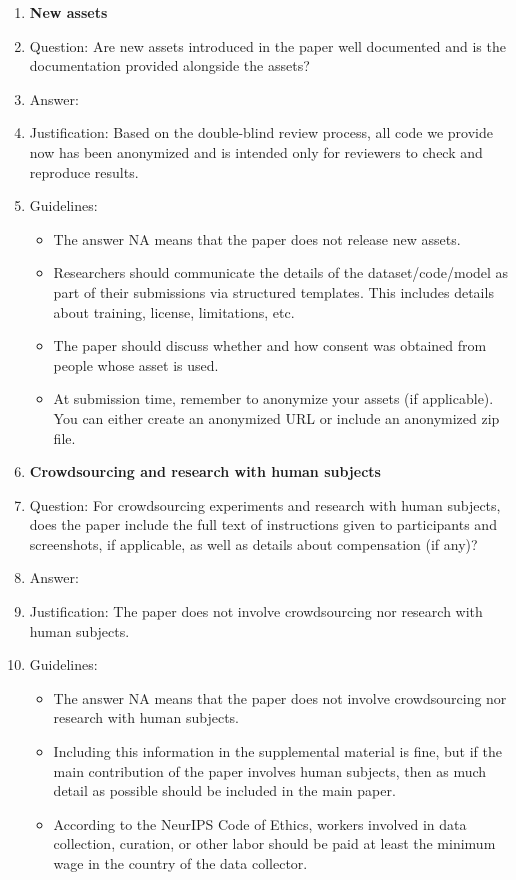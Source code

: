 \documentclass{article}
\begin{document}
\begin{enumerate}
\item {\bf New assets}
    \item[] Question: Are new assets introduced in the paper well documented and is the documentation provided alongside the assets?
    \item[] Answer: \answerNo{} %
    \item[] Justification: Based on the double-blind review process, all code we provide now has been anonymized and is intended only for reviewers to check and reproduce results.
    \item[] Guidelines:
    \begin{itemize}
        \item The answer NA means that the paper does not release new assets.
        \item Researchers should communicate the details of the dataset/code/model as part of their submissions via structured templates. This includes details about training, license, limitations, etc. 
        \item The paper should discuss whether and how consent was obtained from people whose asset is used.
        \item At submission time, remember to anonymize your assets (if applicable). You can either create an anonymized URL or include an anonymized zip file.
    \end{itemize}

\item {\bf Crowdsourcing and research with human subjects}
    \item[] Question: For crowdsourcing experiments and research with human subjects, does the paper include the full text of instructions given to participants and screenshots, if applicable, as well as details about compensation (if any)? 
    \item[] Answer: \answerNA{} %
    \item[] Justification: The paper does not involve crowdsourcing nor research with human subjects.
    \item[] Guidelines:
    \begin{itemize}
        \item The answer NA means that the paper does not involve crowdsourcing nor research with human subjects.
        \item Including this information in the supplemental material is fine, but if the main contribution of the paper involves human subjects, then as much detail as possible should be included in the main paper. 
        \item According to the NeurIPS Code of Ethics, workers involved in data collection, curation, or other labor should be paid at least the minimum wage in the country of the data collector. 
    \end{itemize}


\end{enumerate}
\end{document}
